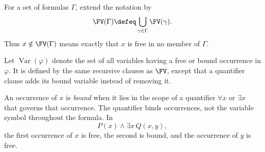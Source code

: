 For a set of formulas \(\Gamma\), extend the notation by
\[
  \FV(\Gamma)\defeq\bigcup_{\gamma\in\Gamma}\FV(\gamma).
\]
Thus \(x\notin\FV(\Gamma)\) means exactly that \(x\) is free in no member of
\(\Gamma\).

Let \(\operatorname{Var}(\varphi)\) denote the set of all variables having a
free or bound occurrence in \(\varphi\).  It is defined by the same recursive
clauses as \(\FV\), except that a quantifier clause adds its bound variable
instead of removing it.

An occurrence of \(x\) is \emph{bound} when it lies in the scope of a
quantifier \(\forall x\) or \(\exists x\) that governs that occurrence.  The
quantifier binds occurrences, not the variable symbol throughout the formula.
In
\[
  P(x)\land\exists x\,Q(x,y),
\]
the first occurrence of \(x\) is free, the second is bound, and the occurrence
of \(y\) is free.

